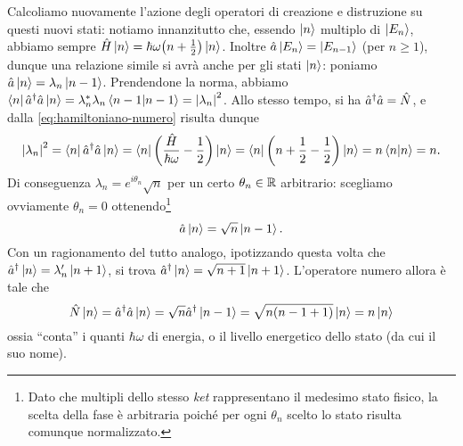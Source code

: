 Calcoliamo nuovamente l'azione degli operatori di creazione e distruzione su questi nuovi stati: notiamo innanzitutto che, essendo $\left|{n}\right\rangle$ multiplo di $\left|{E_n}\right\rangle$, abbiamo sempre $\hat{H}\left|{n}\right\rangle=\hbar\omega\big(n+\frac12\big)\left|{n}\right\rangle$.
Inoltre $\hat{a}\left|{E_n}\right\rangle=\left|{E_{n-1}}\right\rangle$ (per $n\ge 1$), dunque una relazione simile si avrà anche per gli stati $\left|{n}\right\rangle$: poniamo $\hat{a}\left|{n}\right\rangle=\lambda_n\left|{n-1}\right\rangle$.
Prendendone la norma, abbiamo $\left\langle{n}\right|{\hat{a}}^\dagger\hat{a}\left|{n}\right\rangle=\lambda_n^*\lambda_n\left\langle{n-1}\middle|{n-1}\right\rangle=\left|{\lambda_n}\right|^2$.
Allo stesso tempo, si ha ${\hat{a}}^\dagger\hat{a}=\hat{N}$, e dalla \eqref{eq:hamiltoniano-numero} risulta dunque
\begin{equation}
	\left|{\lambda_n}\right|^2=\left\langle{n}\right|{\hat{a}}^\dagger\hat{a}\left|{n}\right\rangle=\left\langle{n}\right|\bigg(\frac{\hat{H}}{\hbar\omega}-\frac12\bigg)\left|{n}\right\rangle=\left\langle{n}\right|\bigg(n+\frac12-\frac12\bigg)\left|{n}\right\rangle=n\left\langle{n}\middle|{n}\right\rangle=n.
\end{equation}
Di conseguenza $\lambda_n=e^{i\theta_n}\sqrt{n}$ per un certo $\theta_n\in\mathbb{R}$ arbitrario: scegliamo ovviamente $\theta_n=0$ ottenendo\footnote{Dato che multipli dello stesso \emph{ket} rappresentano il medesimo stato fisico, la scelta della fase è arbitraria poich\'e per ogni $\theta_n$ scelto lo stato risulta comunque normalizzato.}
\begin{equation}
	\hat{a}\left|{n}\right\rangle=\sqrt{n}\left|{n-1}\right\rangle.
\end{equation}
Con un ragionamento del tutto analogo, ipotizzando questa volta che ${\hat{a}}^\dagger\left|{n}\right\rangle=\lambda_n'\left|{n+1}\right\rangle$, si trova ${\hat{a}}^\dagger\left|{n}\right\rangle=\sqrt{n+1}\left|{n+1}\right\rangle$.
L'operatore numero allora è tale che
\begin{equation}
	\hat{N}\left|{n}\right\rangle={\hat{a}}^\dagger\hat{a}\left|{n}\right\rangle=\sqrt{n}{\hat{a}}^\dagger\left|{n-1}\right\rangle=\sqrt{n(n-1+1)}\left|{n}\right\rangle=n\left|{n}\right\rangle
\end{equation}
ossia ``conta'' i quanti $\hbar\omega$ di energia, o il livello energetico dello stato (da cui il suo nome).

